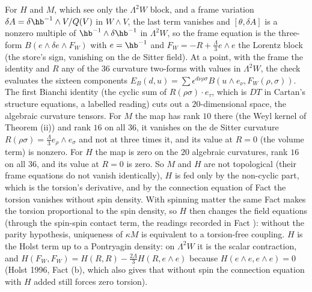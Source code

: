 For $H$ and $M$, which see only the $\Lambda^{2}W$ block, and a frame variation $\delta A = \delta\hb^{-1} \wedge V/Q(V)$ in $W \wedge V$, the last term vanishes and $[\theta, \delta A]$ is a nonzero multiple of $\hb^{-1} \wedge \delta\hb^{-1}$ in $\Lambda^{2}W$, so the frame equation is the three-form $B(e \wedge \delta e \wedge F_{W})$ with $e = \hb^{-1}$ and $F_{W} = -R + \tfrac{\Lambda}{3}e \wedge e$ the Lorentz block (the store's sign, vanishing on the de Sitter field). At a point, with the frame the identity and $R$ any of the $36$ curvature two-forms with values in $\Lambda^{2}W$, the check evaluates the sixteen components $E_{B}(d, u) = \sum\epsilon^{d\nu\rho\sigma}B(u \wedge e_{\nu}, F_{W}(\rho, \sigma))$. The first Bianchi identity (the cyclic sum of $R(\rho\sigma) \cdot e_{\tau}$, which is $DT$ in Cartan's structure equations, a labelled reading) cuts out a $20$-dimensional space, the algebraic curvature tensors. For $M$ the map has rank $10$ there (the Weyl kernel of Theorem (ii)) and rank $16$ on all $36$, it vanishes on the de Sitter curvature $R(\rho\sigma) = \tfrac{\Lambda}{3}e_{\rho} \wedge e_{\sigma}$ and not at three times it, and its value at $R = 0$ (the volume term) is nonzero. For $H$ the map is zero on the $20$ algebraic curvatures, rank $16$ on all $36$, and its value at $R = 0$ is zero. So $M$ and $H$ are not topological (their frame equations do not vanish identically), $H$ is fed only by the non-cyclic part, which is the torsion's derivative, and by the connection equation of Fact  the torsion vanishes without spin density. With spinning matter the same Fact makes the torsion proportional to the spin density, so $H$ then changes the field equations (through the spin-spin contact term, the readings recorded in Fact ): without the parity hypothesis, uniqueness of $\kappa M$ is equivalent to a torsion-free coupling. $H$ is the Holst term up to a Pontryagin density: on $\Lambda^{2}W$ it is the scalar contraction, and $H(F_{W}, F_{W}) = H(R, R) - \tfrac{2\Lambda}{3}H(R, e \wedge e)$ because $H(e \wedge e, e \wedge e) = 0$ (Holst 1996, Fact (b), which also gives that without spin the connection equation with $H$ added still forces zero torsion).

